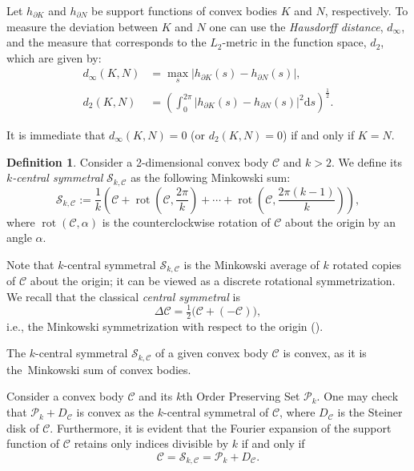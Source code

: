 \documentclass{amsart}
\theoremstyle{definition}
\newtheorem{defn}[thm]{Definition}
\numberwithin{equation}{section}
\renewcommand{\d}{\mathrm{d}}
\begin{document}
Let $h_{\partial K}$ and $h_{\partial N}$ be support functions of convex bodies $K$ and $N$, respectively. To measure the deviation between $K$ and $N$ one can use the \textit{Hausdorff distance}, $d_{\infty}$, and the measure that corresponds to the $L_2$-metric in the function space, $d_2$, which are given by:
\begin{align}\label{HausdorffDistance}
d_{\infty}(K,N)&=\max_{s}\Big|h_{\partial K}(s)-h_{\partial N}(s)\Big|,\\
\label{LTwoDistance}
d_2(K,N)&=\left(\int_0^{2\pi}\Big|h_{\partial K}(s)-h_{\partial N}(s)\Big|^2\d s\right)^{\frac{1}{2}}.
\end{align}

It is immediate that $d_{\infty}(K,N)=0$ (or $d_2(K,N)=0$) if and only if $K=N$.

\begin{defn}
    Consider a 2-dimensional convex body $\mathcal{C}$ and $k>2$. We define its \textit{$k$-central symmetral} $\mathcal{S}_{k,\mathcal{C}}$ as the following Minkowski sum: 
    $$\mathcal{S}_{k,\mathcal{C}}:= \frac{1}{k}\left( \mathcal{C} + \operatorname{rot}\left(\mathcal{C},\frac{2\pi}{k}\right) + \cdots + \operatorname{rot}\left(\mathcal{C},\frac{2\pi(k-1)}{k}\right)\right),$$
    where $\operatorname{rot}\left(\mathcal{C},\alpha\right)$ is the counterclockwise rotation of $\mathcal{C}$ about the origin by an angle $\alpha$.
\end{defn}

Note that $k$-central symmetral $\mathcal{S}_{k,\mathcal{C}}$ is the Minkowski average of $k$ rotated copies of $\mathcal C$ about the origin; 
it can be viewed as a discrete rotational symmetrization. We recall that the classical \emph{central symmetral} is
\[
\Delta\mathcal{C} = \tfrac12\big(\mathcal{C}+(-\mathcal{C})\big),
\]
i.e., the Minkowski symmetrization with respect to the origin (\cite{SchneiderBook}).

    The $k$-central symmetral $\mathcal{S}_{k,\mathcal{C}}$ of a given convex body $\mathcal{C}$ is convex, as it is the~Minkowski sum of convex bodies.

    Consider a convex body $\mathcal{C}$ and its $k$th Order Preserving Set $\mathcal{P}_k$. One may check that $\mathcal{P}_k + D_{\mathcal{C}}$ is convex as the $k$-central symmetral of $\mathcal{C}$, where $D_{\mathcal{C}}$ is the Steiner disk of $\mathcal{C}$.
    Furthermore, it is evident that the Fourier expansion of the support function of $\mathcal{C}$ retains only indices divisible by $k$ if and only if
    $$\mathcal{C} = \mathcal{S}_{k,\mathcal{C}} = \mathcal{P}_k + D_{\mathcal{C}}.$$
\end{document}
